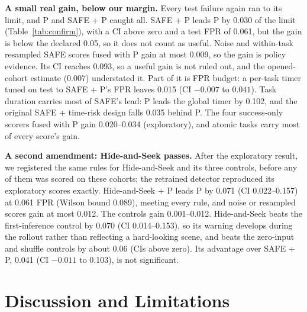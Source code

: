 \documentclass[10pt,a4paper,twocolumn]{article}
\begin{document}
\textbf{A small real gain, below our margin.} Every test failure again ran to its limit, and
P and SAFE + P caught all. SAFE + P leads P by 0.030 of the limit
(Table~\ref{tab:confirm}), with a CI above zero and a test FPR of 0.061, but the gain is
below the declared 0.05, so it does not count as useful. Noise and
within-task resampled SAFE scores fused with P gain at most 0.009, so the gain is policy
evidence. Its CI reaches 0.093, so a useful gain is not ruled out, and the opened-cohort
estimate (0.007) understated it. Part of it is FPR budget: a per-task timer tuned on test to
SAFE + P's FPR leaves 0.015 (CI $-0.007$ to $0.041$). Task duration carries most of SAFE's
lead: P leads the global timer by 0.102, and the original SAFE + time-risk design falls 0.035
behind P. The four success-only scorers fused with P gain 0.020--0.034 (exploratory), and atomic
tasks carry most of every score's gain.

\textbf{A second amendment: Hide-and-Seek passes.} After the exploratory result, we registered
the same rules for Hide-and-Seek and its three controls, before any of them was scored on these
cohorts; the retrained detector reproduced its exploratory scores exactly. Hide-and-Seek + P
leads P by 0.071 (CI 0.022--0.157) at 0.061 FPR (Wilson bound 0.089), meeting every rule, and
noise or resampled scores gain at most 0.012. The controls gain 0.001--0.012. Hide-and-Seek
beats the first-inference control by 0.070 (CI 0.014--0.153), so its warning develops during
the rollout rather than reflecting a hard-looking scene, and beats the zero-input and shuffle
controls by about 0.06 (CIs above zero). Its advantage over SAFE + P, 0.041 (CI $-0.011$ to
0.103), is not significant.

\section{Discussion and Limitations}
\end{document}
